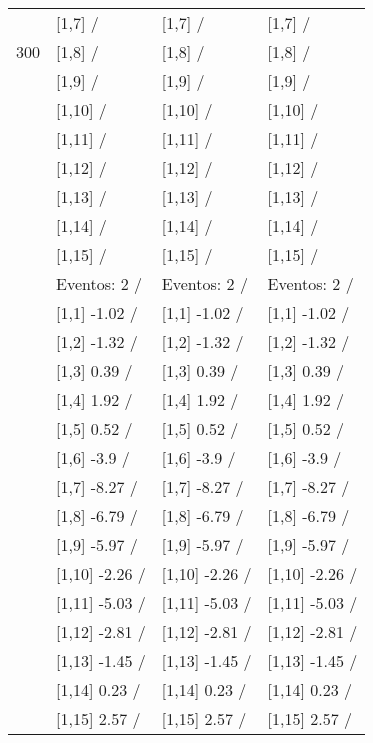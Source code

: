 \begin{table}
\begin{tabular}[t]{llll}
 & {}[1,7]  / & {}[1,7]  / & {}[1,7]  /\\
300 & {}[1,8]  / & {}[1,8]  / & {}[1,8]  /\\
\addlinespace
 & {}[1,9]  / & {}[1,9]  / & {}[1,9]  /\\
 & {}[1,10]  / & {}[1,10]  / & {}[1,10]  /\\
 & {}[1,11]  / & {}[1,11]  / & {}[1,11]  /\\
 & {}[1,12]  / & {}[1,12]  / & {}[1,12]  /\\
 & {}[1,13]  / & {}[1,13]  / & {}[1,13]  /\\
\addlinespace
 & {}[1,14]  / & {}[1,14]  / & {}[1,14]  /\\
 & {}[1,15]  / & {}[1,15]  / & {}[1,15]  /\\
 & Eventos:  2 / & Eventos:  2 / & Eventos:  2 /\\
 & {}[1,1] -1.02  / & {}[1,1] -1.02  / & {}[1,1] -1.02  /\\
 & {}[1,2] -1.32  / & {}[1,2] -1.32  / & {}[1,2] -1.32  /\\
\addlinespace
 & {}[1,3] 0.39  / & {}[1,3] 0.39  / & {}[1,3] 0.39  /\\
 & {}[1,4] 1.92  / & {}[1,4] 1.92  / & {}[1,4] 1.92  /\\
 & {}[1,5] 0.52  / & {}[1,5] 0.52  / & {}[1,5] 0.52  /\\
 & {}[1,6] -3.9  / & {}[1,6] -3.9  / & {}[1,6] -3.9  /\\
 & {}[1,7] -8.27  / & {}[1,7] -8.27  / & {}[1,7] -8.27  /\\
\addlinespace
500 & {}[1,8] -6.79  / & {}[1,8] -6.79  / & {}[1,8] -6.79  /\\
 & {}[1,9] -5.97  / & {}[1,9] -5.97  / & {}[1,9] -5.97  /\\
 & {}[1,10] -2.26  / & {}[1,10] -2.26  / & {}[1,10] -2.26  /\\
 & {}[1,11] -5.03  / & {}[1,11] -5.03  / & {}[1,11] -5.03  /\\
 & {}[1,12] -2.81  / & {}[1,12] -2.81  / & {}[1,12] -2.81  /\\
\addlinespace
 & {}[1,13] -1.45  / & {}[1,13] -1.45  / & {}[1,13] -1.45  /\\
 & {}[1,14] 0.23  / & {}[1,14] 0.23  / & {}[1,14] 0.23  /\\
 & {}[1,15] 2.57  / & {}[1,15] 2.57  / & {}[1,15] 2.57  /\\
\bottomrule
\end{tabular}
\end{table}
